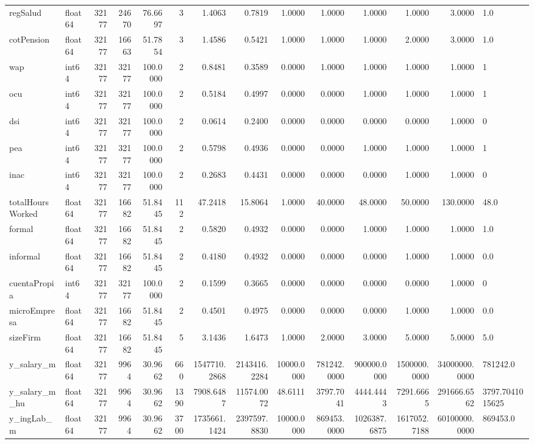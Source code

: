 \begin{longtable}{llrrrrrrrrrrrl}
regSalud & float64 & 32177 & 24670 & 76.6697 & 3 & 1.4063 & 0.7819 & 1.0000 & 1.0000 & 1.0000 & 1.0000 & 3.0000 & 1.0 \\
cotPension & float64 & 32177 & 16663 & 51.7854 & 3 & 1.4586 & 0.5421 & 1.0000 & 1.0000 & 1.0000 & 2.0000 & 3.0000 & 1.0 \\
wap & int64 & 32177 & 32177 & 100.0000 & 2 & 0.8481 & 0.3589 & 0.0000 & 1.0000 & 1.0000 & 1.0000 & 1.0000 & 1 \\
ocu & int64 & 32177 & 32177 & 100.0000 & 2 & 0.5184 & 0.4997 & 0.0000 & 0.0000 & 1.0000 & 1.0000 & 1.0000 & 1 \\
dsi & int64 & 32177 & 32177 & 100.0000 & 2 & 0.0614 & 0.2400 & 0.0000 & 0.0000 & 0.0000 & 0.0000 & 1.0000 & 0 \\
pea & int64 & 32177 & 32177 & 100.0000 & 2 & 0.5798 & 0.4936 & 0.0000 & 0.0000 & 1.0000 & 1.0000 & 1.0000 & 1 \\
inac & int64 & 32177 & 32177 & 100.0000 & 2 & 0.2683 & 0.4431 & 0.0000 & 0.0000 & 0.0000 & 1.0000 & 1.0000 & 0 \\
totalHoursWorked & float64 & 32177 & 16682 & 51.8445 & 112 & 47.2418 & 15.8064 & 1.0000 & 40.0000 & 48.0000 & 50.0000 & 130.0000 & 48.0 \\
formal & float64 & 32177 & 16682 & 51.8445 & 2 & 0.5820 & 0.4932 & 0.0000 & 0.0000 & 1.0000 & 1.0000 & 1.0000 & 1.0 \\
informal & float64 & 32177 & 16682 & 51.8445 & 2 & 0.4180 & 0.4932 & 0.0000 & 0.0000 & 0.0000 & 1.0000 & 1.0000 & 0.0 \\
cuentaPropia & int64 & 32177 & 32177 & 100.0000 & 2 & 0.1599 & 0.3665 & 0.0000 & 0.0000 & 0.0000 & 0.0000 & 1.0000 & 0 \\
microEmpresa & float64 & 32177 & 16682 & 51.8445 & 2 & 0.4501 & 0.4975 & 0.0000 & 0.0000 & 0.0000 & 1.0000 & 1.0000 & 0.0 \\
sizeFirm & float64 & 32177 & 16682 & 51.8445 & 5 & 3.1436 & 1.6473 & 1.0000 & 2.0000 & 3.0000 & 5.0000 & 5.0000 & 5.0 \\
y\_salary\_m & float64 & 32177 & 9964 & 30.9662 & 660 & 1547710.2868 & 2143416.2284 & 10000.0000 & 781242.0000 & 900000.0000 & 1500000.0000 & 34000000.0000 & 781242.0 \\
y\_salary\_m\_hu & float64 & 32177 & 9964 & 30.9662 & 1390 & 7908.6487 & 11574.0072 & 48.6111 & 3797.7041 & 4444.4443 & 7291.6665 & 291666.6562 & 3797.7041015625 \\
y\_ingLab\_m & float64 & 32177 & 9964 & 30.9662 & 3700 & 1735661.1424 & 2397597.8830 & 10000.0000 & 869453.0000 & 1026387.6875 & 1617052.7188 & 60100000.0000 & 869453.0 \\

\end{longtable}

